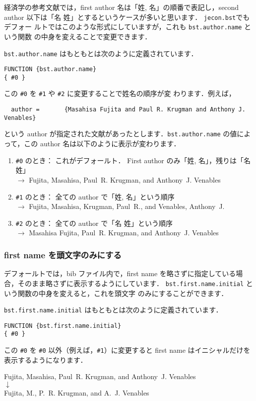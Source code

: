 \documentclass[article]{jlreq}
\begin{document}
経済学の参考文献では，first author 名は「姓, 名」の順番で表記し，second author
以下は「名 姓」とするというケースが多いと思います．  \texttt{jecon.bst}でもデフォー
ルトではこのような形式にしていますが，これも \texttt{bst.author.name} という関数
の中身を変えることで変更できます．

\texttt{bst.author.name} はもともとは次のように定義されています．
\begin{screen}
\begin{verbatim}
FUNCTION {bst.author.name}
{ #0 }
\end{verbatim}
\end{screen}
この \verb|#0| を \verb|#1| や \verb|#2| に変更することで姓名の順序が変
わります．例えば，
\begin{verbatim}
  author =       {Masahisa Fujita and Paul R. Krugman and Anthony J. Venables}
\end{verbatim}
という author が指定された文献があったとします．\texttt{bst.author.name} 
の値によって，この author 名は以下のように表示が変わります．
\begin{enumerate}
 \item \verb|#0| のとき： これがデフォールト． First author のみ「姓, 
       名」，残りは「名 姓」\\
       $\rightarrow$ Fujita, Masahisa, Paul~R. Krugman, and
       Anthony~J. Venables
 \item \verb|#1| のとき： 全ての author で「姓, 名」という順序\\
       $\rightarrow$ Fujita, Masahisa, Krugman, Paul~R., and Venables, Anthony~J.
 \item \verb|#2| のとき： 全ての author で「名 姓」という順序\\
       $\rightarrow$ Masahisa Fujita, Paul~R. Krugman, and Anthony~J. Venables
\end{enumerate}

\subsubsection{first name を頭文字のみにする}

デフォールトでは，bib ファイル内で，first name を略さずに指定している場
合，そのまま略さずに表示するようにしています．
\texttt{bst.first.name.initial} という関数の中身を変えると，これを頭文字
のみにすることができます．

\texttt{bst.first.name.initial} はもともとは次のように定義されています．
\begin{screen}
\begin{verbatim}
FUNCTION {bst.first.name.initial}
{ #0 }
\end{verbatim}
\end{screen}
この \verb|#0| を \verb|#0| 以外（例えば，\verb|#1|）に変更すると
first name はイニシャルだけを表示するようになります．
\begin{center}
Fujita, Masahisa, Paul~R. Krugman, and Anthony~J. Venables \\
 $\downarrow$ \\
Fujita, M., P.~R. Krugman, and A.~J. Venables
\end{center}
\end{document}

